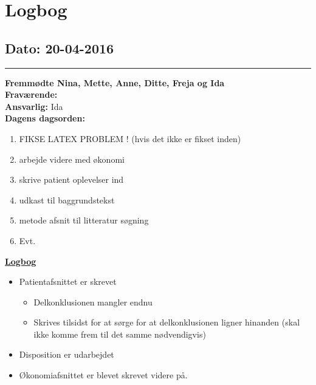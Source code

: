 \chapter{Logbog}
\section{Dato: 20-04-2016}
\hrule
\textbf{Fremmødte Nina, Mette, Anne, Ditte, Freja og Ida } \\
\textbf{Fraværende: } \\
\textbf{Ansvarlig:} Ida  \\
\textbf{Dagens dagsorden: }
\begin{enumerate}
	\item FIKSE LATEX PROBLEM ! (hvis det ikke er fikset inden)
	\item arbejde videre med økonomi
	\item skrive patient oplevelser ind
	\item udkast til baggrundstekst
	\item metode afsnit til litteratur søgning
	\item Evt. 
\end{enumerate}

\underline{\textbf{Logbog}}
\begin{itemize}
\item Patientafsnittet er skrevet
\begin{itemize}
\item Delkonklusionen mangler endnu 
\item Skrives tilsidst for at sørge for at delkonklusionen ligner hinanden (skal ikke komme frem til det samme nødvendigvis)
\end{itemize}
\item Disposition er udarbejdet
\item Økonomiafsnittet er blevet skrevet videre på.
\end{itemize}

\newpage